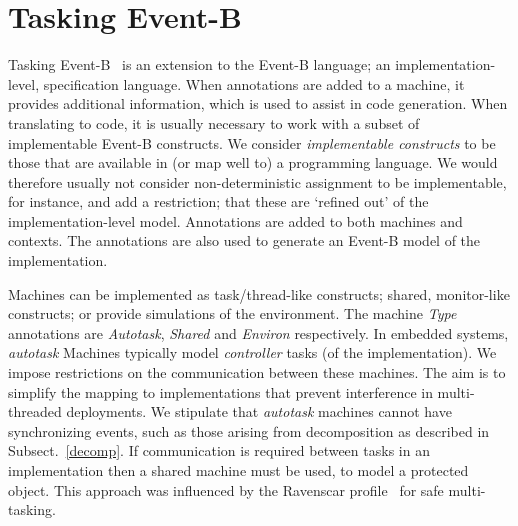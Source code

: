 \documentclass{llncs}%
\begin{document}
\section{Tasking Event-B}\label{TEB}
Tasking Event-B~\cite{ae2011a} is an extension to the Event-B language; an implementation-level, specification language. When annotations are added to a machine, it provides additional information, which is used to assist in code generation. When translating to code, it is usually necessary to work with a subset of implementable Event-B constructs. We consider \emph{implementable constructs} to be those that are available in (or map well to) a programming language. We would therefore usually not consider non-deterministic assignment to be implementable, for instance, and add a restriction; that these are `refined out' of the implementation-level model. Annotations are added to both machines and contexts. The annotations are also used to generate an Event-B model of the implementation. 

Machines can be implemented as task/thread-like constructs; shared, monitor-like constructs; or provide simulations of the environment.  The machine \emph{Type} annotations are \emph{Autotask}, \emph{Shared} and \emph{Environ} respectively.  In embedded systems, \emph{autotask} Machines typically model \emph{controller} tasks (of the implementation). We impose restrictions on the communication between these machines. The aim is to simplify the mapping to implementations that prevent interference in multi-threaded deployments. We stipulate that \emph{autotask} machines cannot have synchronizing events, such as those arising from decomposition as described in Subsect.~\ref{decomp}. If communication is required between tasks in an implementation then a shared machine must be used, to model a protected object. This approach was influenced by the Ravenscar profile~\cite{Burns1999} for safe multi-tasking. 
\end{document}
